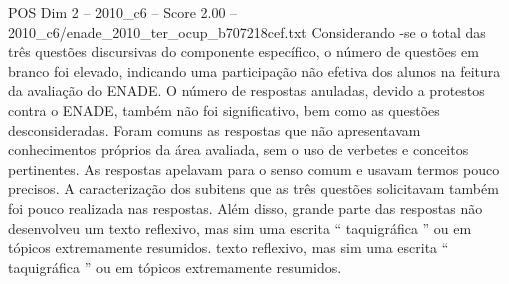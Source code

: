\begin{textsample}{POS Dim 2 – 2010\_c6 – Score 2.00 – 2010\_c6/enade\_2010\_ter\_ocup\_b707218cef.txt}
Considerando -se o total das três questões discursivas do componente específico, o número de questões em branco foi elevado, indicando uma participação não efetiva dos alunos na feitura da avaliação do ENADE.
O número de respostas anuladas, devido a protestos contra o ENADE, também não foi significativo, bem como as questões desconsideradas.
Foram comuns as respostas que não apresentavam conhecimentos próprios da área avaliada, sem o uso de verbetes e conceitos pertinentes.
As respostas apelavam para o senso comum e usavam termos pouco precisos.
A caracterização dos subitens que as três questões solicitavam também foi pouco realizada nas respostas.
Além disso, grande parte das respostas não desenvolveu um texto reflexivo, mas sim uma escrita “ taquigráfica ” ou em tópicos extremamente resumidos. texto reflexivo, mas sim uma escrita “ taquigráfica ” ou em tópicos extremamente resumidos.

\end{textsample}
